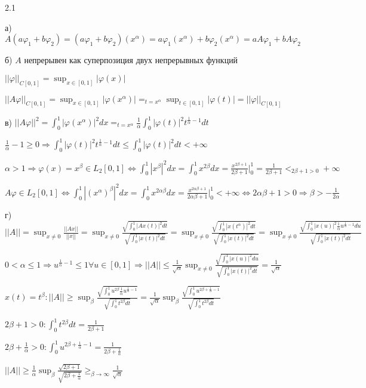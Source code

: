 \documentclass[russian]{article}
\begin{document}
2.1

а) $A(a\varphi_1+b\varphi_2)=(a\varphi_1+b\varphi_2)(x^\alpha)=a\varphi_1(x^\alpha)+b\varphi_2(x^\alpha)=aA\varphi_1+bA\varphi_2$

б) $A$ непрерывен как суперпозиция двух непрерывных функций

$||\varphi||_{C[0,1]}=\sup_{x\in[0,1]}|\varphi(x)|$

$||A\varphi||_{C[0,1]}=\sup_{x\in[0,1]}|\varphi(x^\alpha)|=_{t=x^\alpha}\sup_{t\in[0,1]}|\varphi(t)|=||\varphi||_{C[0,1]}$

в) $||A\varphi||^2=\int_0^1|\varphi(x^\alpha)|^2dx=_{t=x^\alpha}\frac{1}{\alpha}\int_0^1|\varphi(t)|^2t^{\frac{1}{\alpha}-1}dt$

$\frac{1}{\alpha}-1\ge0\Rightarrow\int_0^1|\varphi(t)|^2t^{\frac{1}{\alpha}-1}dt\le\int_0^1|\varphi(t)|^2dt<+\infty$

$\alpha>1\Rightarrow\varphi(x)=x^\beta\in L_2[0,1]\Leftrightarrow\int_0^1|x^\beta|^2dx=\int_0^1x^{2\beta}dx=\frac{x^{2\beta+1}}{2\beta+1}|_0^1=\frac{1}{2\beta+1}<_{2\beta+1>0}+\infty$

$A\varphi\in L_2[0,1] \Leftrightarrow \int_0^1|(x^\alpha)^\beta|^2dx=\int_0^1x^{2\alpha\beta}dx=\frac{x^{2\alpha\beta+1}}{2\alpha\beta+1}|_0^1<+\infty \Leftrightarrow 2\alpha\beta+1>0 \Rightarrow \beta > -\frac{1}{2\alpha}$

г) $ ||A||=\sup_{x\ne0}\frac{||Ax||}{||x||}=\sup_{x\ne0}\frac{\sqrt{\int_0^1|Ax(t)|^2dt}}{\sqrt{\int_0^1|x(t)|^2dt}}=\sup_{x\ne0}\frac{\sqrt{\int_0^1|x(t^\alpha)|^2dt}}{\sqrt{\int_0^1|x(t)|^2dt}}=\sup_{x\ne0}\frac{\sqrt{\int_0^1|x(u)|^2\frac{1}{\alpha}u^{\frac{1}{\alpha}-1}du}}{\sqrt{\int_0^1|x(t)|^2dt}} $

$ 0 < \alpha \le 1 \Rightarrow u^{\frac{1}{\alpha}-1} \le 1 \forall u \in [0,1] \Rightarrow ||A|| \le \frac{1}{\sqrt{\alpha}} \sup_{x\ne0}\frac{\sqrt{\int_0^1|x(u)|^2du}}{\sqrt{\int_0^1|x(t)|^2dt}}=\frac{1}{\sqrt{\alpha}}$

$ x(t)=t^\beta : ||A|| \ge \sup_{\beta}\frac{\sqrt{\int_0^1u^{2\beta}\frac{1}{\alpha}u^{\frac{1}{\alpha}-1}}}{\sqrt{\int_0^1t^{2\beta}dt}} = \frac{1}{\sqrt{\alpha}}\sup_{\beta}\frac{\sqrt{\int_0^1u^{2\beta+\frac{1}{\alpha}-1}}}{\sqrt{\int_0^1t^{2\beta}dt}}$

$ 2 \beta + 1 > 0 : \int_0^1t^{2\beta}dt = \frac{1}{2\beta+1} $

$ 2\beta + \frac{1}{\alpha} > 0 : \int_0^1u^{2\beta+\frac{1}{\alpha}-1} = \frac{1}{2\beta+\frac{1}{\alpha}} $

$ ||A|| \ge \frac{1}{\alpha} \sup _ \beta \frac{\sqrt{2\beta+1}}{\sqrt{2\beta+\frac{1}{\alpha}}} \ge_{\beta \rightarrow \infty } \frac{1}{\sqrt{\alpha}}$
\end{document}
